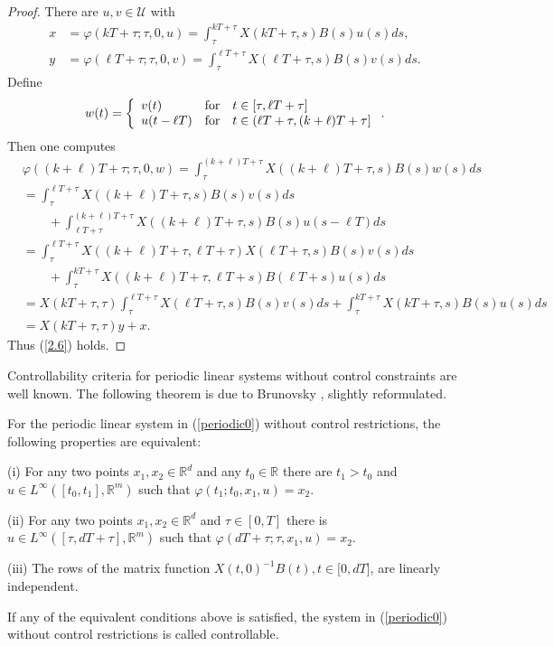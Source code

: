 \documentclass{siamltex}%
\begin{document}
\begin{proof}
There are $u,v\in\mathcal{U}$ with
\begin{align*}
x  &  =\varphi(kT+\tau;\tau,0,u)=\int_{\tau}^{kT+\tau}X(kT+\tau
,s)B(s)u(s)ds,\\
y  &  =\varphi(\ell T+\tau;\tau,0,v)=\int_{\tau}^{\ell T+\tau}X(\ell
T+\tau,s)B(s)v(s)ds.
\end{align*}
Define%
\[
w(t)=\left\{
\begin{array}
[c]{lll}%
v(t) & \text{for} & t\in\lbrack\tau,\ell T+\tau]\\
u(t-\ell T) & \text{for} & t\in(\ell T+\tau,(k+\ell)T+\tau]
\end{array}
\right.  .
\]
Then one computes%
\begin{align*}
&  \varphi((k+\ell)T+\tau;\tau,0,w)=\int_{\tau}^{(k+\ell)T+\tau}%
X((k+\ell)T+\tau,s)B(s)w(s)ds\\
&  =\int_{\tau}^{\ell T+\tau}X((k+\ell)T+\tau,s)B(s)v(s)ds\\
&  \qquad+\int_{\ell T+\tau}^{(k+\ell)T+\tau}X((k+\ell)T+\tau,s)B(s)u(s-\ell
T)ds\\
&  =\int_{\tau}^{\ell T+\tau}X((k+\ell)T+\tau,\ell T+\tau)X(\ell
T+\tau,s)B(s)v(s)ds\\
&  \qquad+\int_{\tau}^{kT+\tau}X((k+\ell)T+\tau,\ell T+s)B(\ell T+s)u(s)ds\\
&  =X(kT+\tau,\tau)\int_{\tau}^{\ell T+\tau}X(\ell T+\tau,s)B(s)v(s)ds+\int
_{\tau}^{kT+\tau}X(kT+\tau,s)B(s)u(s)ds\\
&  =X(kT+\tau,\tau)y+x.
\end{align*}
Thus (\ref{2.6}) holds.
\end{proof}

Controllability criteria for periodic linear systems without control
constraints are well known. The following theorem is due to Brunovsky
\cite{Brun}, slightly reformulated.

\begin{theorem}
\label{Theorem_Brunovsky}For the periodic linear system in (\ref{periodic0})
without control restrictions, the following properties are equivalent:

(i) For any two points $x_{1},x_{2}\in\mathbb{R}^{d}$ and any $t_{0}%
\in\mathbb{R}$ there are $t_{1}>t_{0}$ and $u\in L^{\infty}([t_{0}%
,t_{1}],\mathbb{R}^{m})$ such that $\varphi(t_{1};t_{0},x_{1},u)=x_{2}$.

(ii) For any two points $x_{1},x_{2}\in\mathbb{R}^{d}$ and $\tau\in\left[
0,T\right]  $ there is $u\in L^{\infty}([\tau,dT+\tau],\mathbb{R}^{m})$ such
that $\varphi(dT+\tau;\tau,x_{1},u)=x_{2}$.

(iii) The rows of the matrix function $X(t,0)^{-1}B(t),t\in\lbrack0,dT]$, are
linearly independent.

If any of the equivalent conditions above is satisfied, the system in
(\ref{periodic0}) without control restrictions is called controllable.
\end{theorem}
\end{document}
